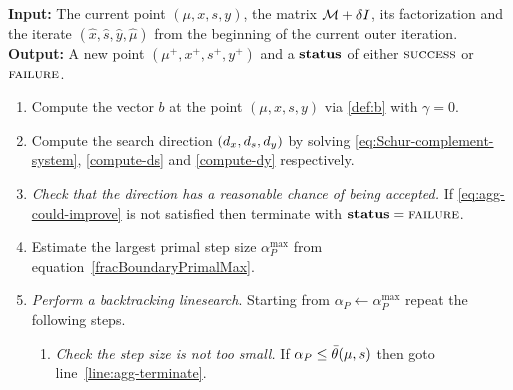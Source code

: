 \documentclass{article}
\begin{document}
\begin{algorithm}[H]
\textbf{Input:} The current point $(\mu, x, s, y)$, the matrix $\mathcal{M} + \delta I$, its factorization and the iterate $(\hat{x}, \hat{s},  \hat{y}, \hat{\mu})$ from the beginning of the current outer iteration.  \\
\textbf{Output:} A new point $(\mu^{+}, x^{+}, s^{+}, y^{+})$ and a $\textbf{status}$ of either $\textsc{success}$ or $\textsc{failure}$.
\begin{enumerate}[label*=A.{\arabic*}]
\item Compute the vector $b$ at the point $(\mu, x, s, y)$ via \eqref{def:b} with $\gamma = 0$.
\item Compute the search direction $(d_{x}, d_{s}, d_{y})$ by solving \eqref{eq:Schur-complement-system}, \eqref{compute-ds} and \eqref{compute-dy} respectively.
\item \emph{Check that the direction has a reasonable chance of being accepted.} If \eqref{eq:agg-could-improve} is not satisfied then terminate with $\textbf{status} = \textsc{failure}$.
\item Estimate the largest primal step size $\alpha^{\max}_{P}$ from equation~\eqref{fracBoundaryPrimalMax}.
\item \label{agg:line:back-track} \emph{Perform a backtracking linesearch}. Starting from $\alpha_{P} \gets \alpha^{\max}_{P}$ repeat the following steps.
\begin{enumerate}[label*=.{\arabic*}] %
\item \label{line:agg-back-too-small} \emph{Check the step size is not too small.} If $\alpha_{P} \le \bar{\theta}(\mu, s)$ then goto line~\ref{line:agg-terminate}.

\end{enumerate}
\end{enumerate}
\end{algorithm}
\end{document}

